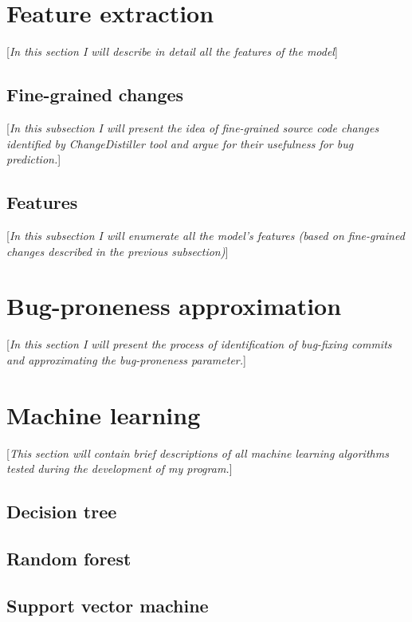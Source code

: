 \documentclass{pracamgr}
\begin{document}
\section{Feature extraction}
\label{sec:feature_extraction}
[\textit{In this section I will describe in detail all the features of the model}]

\subsection{Fine-grained changes}
\label{sec:fine-grained_changes}
[\textit{In this subsection I will present the idea of fine-grained source code changes identified by ChangeDistiller tool and argue for their usefulness for bug prediction.}]

\subsection{Features}
\label{sec:features}
[\textit{In this subsection I will enumerate all the model's features (based on fine-grained changes described in the previous subsection)}]

\section{Bug-proneness approximation}
\label{sec:bug-proneness}
[\textit{In this section I will present the process of identification of bug-fixing commits and approximating the bug-proneness parameter.}]

\section{Machine learning}
\label{sec:machine_learning}
[\textit{This section will contain brief descriptions of all machine learning algorithms tested during the development of my program.}]

\subsection{Decision tree}
\label{sec:decision_tree}

\subsection{Random forest}
\label{sec:random_forest}

\subsection{Support vector machine}
\label{sec:svm}
\end{document}

